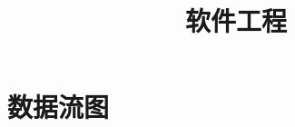\documentclass[UTF8]{ctexart}  %
\begin{document}
	\title{软件工程}  %
	\maketitle     %
	\tableofcontents  %
	
	\section{数据流图}  %
\end{document}

